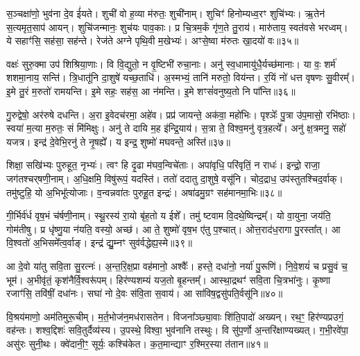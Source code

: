 स॒ञ्चक्षा॑णो॒ भुव॑ना दे॒व ई॑यते।
शुची॑ वो ह॒व्या म॑रुतः॒ शुची॑नाम्।
शुचिꣳ॑ हिनोम्यध्व॒रꣳ शुचि॑भ्यः।
ऋ॒तेन॑ स॒त्यमृत॒साप॑ आयन्।
शुचि॑जन्मानः॒ शुच॑यः पाव॒काः।
प्र चि॒त्रम॒र्कं गृ॑ण॒ते तु॒राय॑।
मारु॑ताय॒ स्वत॑वसे भरध्वम्।
ये सहाꣳ॑सि॒ सह॑सा॒ सह॑न्ते।
रेज॑ते अग्ने पृथि॒वी म॒खेभ्यः॑।
अꣳसे॒ष्वा म॑रुतः खा॒दयो॑ वः॥३५॥\ip

वक्षः॑ सुरु॒क्मा उप॑ शिश्रिया॒णाः।
वि वि॒द्युतो॒ न वृ॒ष्टिभी॑ रुचा॒नाः।
अनु॑ स्व॒धामायु॑धै॒र्यच्छ॑मानाः।
या वः॒ शर्म॑ शशमा॒नाय॒ सन्ति॑।
त्रि॒धातू॑नि दा॒शुषे॑ यच्छ॒ताधि॑।
अ॒स्मभ्यं॒ तानि॑ मरुतो॒ विय॑न्त।
र॒यिं नो॑ धत्त वृषणः सु॒वीरम्᳚।
इ॒मे तु॒रं म॒रुतो॑ रामयन्ति।
इ॒मे सहः॒ सह॑स॒ आ न॑मन्ति।
इ॒मे शꣳसं॑वनुष्य॒तो नि पा᳚न्ति॥३६॥\ip

गु॒रुद्वेषो॒ अर॑रुषे दधन्ति।
अ॒रा इ॒वेदच॑रमा॒ अहे॑व।
प्रप्र॑ जायन्ते॒ अक॑वा॒ महो॑भिः।
पृश्ञेः᳚ पु॒त्रा उ॑प॒मासो॒ रभि॑ष्ठाः।
स्वया॑ म॒त्या म॒रुतः॒ सं मि॑मिक्षुः।
अनु॑ ते दायि म॒ह इ॑न्द्रि॒याय॑।
स॒त्रा ते॒ विश्व॒मनु॑ वृत्र॒हत्ये᳚।
अनु॑ क्ष॒त्रमनु॒ सहो॑ यजत्र।
इन्द्र॑ दे॒वेभि॒रनु॑\- ते नृ॒षह्ये᳚।
य इन्द्र॒ शुष्मो॑ मघवन्ते॒ अस्ति॑॥३७॥\ip

शिक्षा॒ सखि॑भ्यः पुरुहूत॒ नृभ्यः॑।
त्वꣳ हि दृ॒ढा म॑घव॒न्विचे॑ताः।
अपा॑वृधि॒ परि॑वृतिं॒ न राधः॑।
इन्द्रो॒ राजा॒ जग॑तश्चर्‌\mbox{}षणी॒नाम्।
अ॒धि॒क्षमि॒ विषु॑रूपं॒ यदस्ति॑।
ततो॑ ददातु दा॒शुषे॒ वसू॑नि।
चोद॒द्राध॒ उप॑स्तुतश्चिद॒र्वाक्।
तमु॑ष्टुहि॒ यो अ॒भिभू᳚त्योजाः।
व॒न्वन्नवा॑तः पुरुहू॒त इन्द्रः॑।
अषा॑ढमु॒ग्रꣳ सह॑मानमा॒भिः॥३८॥\ip

गी॒र्भिर्व॑र्ध वृष॒भं च॑र्\mbox{}षणी॒नाम्।
स्थू॒रस्य॑ रा॒यो बृ॑ह॒तो य ईशे᳚।
तमु॑ ष्टवाम वि॒दथे॒ष्विन्द्रम्᳚।
यो वा॒युना॒ जय॑ति॒ गोम॑तीषु।
प्र धृ॑ष्णु॒या न॑यति॒ वस्यो॒ अच्छ॑।
आ ते॒ शुष्मो॑ वृष॒भ ए॑तु प॒श्चात्।
ओत्त॒राद॑ध॒रागा पु॒रस्ता᳚त्।
आ वि॒श्वतो॑ अ॒भिसमे᳚त्व॒र्वाङ्।
इन्द्र॑ द्यु॒म्नꣳ सुव॑र्वद्धेह्य॒स्मे॥३९॥\ip\anuvakamend[व॒राहै᳚र्वि॒श्वहा॑\-ऽजनिष्ट पू॒षोद्वरी॑वृजत्खा॒दयो॑ वः पा॒न्त्यस्त्या॒भिर्नव॑ च]

आ दे॒वो या॑तु सवि॒ता सु॒रत्नः॑।
अ॒न्त॒रि॒क्ष॒प्रा वह॑मानो॒ अश्वैः᳚।
हस्ते॒ दधा॑नो॒ नर्या॑ पु॒रूणि॑।
नि॒वे॒शयं॑ च प्रसु॒वं च॒ भूम॑।
अ॒भीवृ॑तं॒ कृश॑नैर्वि॒श्वरू॑पम्।
हिर॑ण्यशम्यं यज॒तो बृ॒हन्तम्᳚।
आस्था॒द्रथꣳ॑ सवि॒ता चि॒त्रभा॑नुः।
कृ॒ष्णा रजाꣳ॑सि॒ तवि॑षीं॒ दधा॑नः।
सघा॑ नो दे॒वः स॑वि॒ता स॒वाय॑।
आ सा॑विष॒द्वसु॑पति॒र्वसू॑नि॥४०॥\ip

वि॒श्रय॑माणो॒ अम॑तिमुरू॒चीम्।
म॒र्त॒भोज॑न॒मध॑रासतेन।
विजना᳚ञ्छ्या॒वाः शि॑ति॒पादो॑ अख्यन्।
रथ॒ꣳ॒ हिर॑ण्यप्रउगं॒ वह॑न्तः।
शश्व॒द्दिशः॑ सवि॒तुर्दैव्य॑स्य।
उ॒पस्थे॒ विश्वा॒ भुव॑नानि तस्थुः।
वि सु॑प॒र्णो अ॒न्तरि॑क्षाण्यख्यत्।
ग॒भी॒रवे॑पा॒ असु॑रः सुनी॒थः।
क्वे॑दानी॒ꣳ॒ सूर्यः॒ कश्चि॑केत।
क॒त॒मान्द्याꣳ र॒श्मिर॒स्या त॑तान॥४१॥\ip

